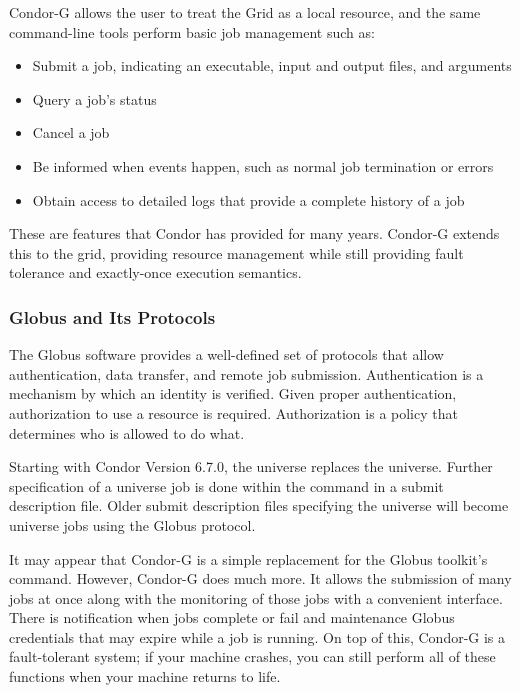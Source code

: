Condor-G allows the user to treat the Grid as a local resource,
and the same command-line tools perform basic job management such as:
\begin{itemize}
\item Submit a job, indicating an executable, input and output files,
and arguments
\item Query a job's status
\item Cancel a job
\item Be informed when events happen,
such as normal job termination or errors
\item Obtain access to detailed logs that provide a complete history of a job
\end{itemize}

These are features that Condor has provided for many years.
Condor-G extends this to the grid,
providing resource management 
while still providing fault tolerance and exactly-once execution 
semantics. 


\subsubsection{\label{sec:Globus-Protocols}Globus and Its Protocols}
The Globus software provides a well-defined set of protocols
that allow authentication, data transfer, and remote job submission.
Authentication is a mechanism by which an identity is verified.
Given proper authentication, authorization to use a resource
is required.
Authorization is a policy that determines who is allowed to do what. 

Starting with Condor Version 6.7.0, the  universe
replaces the  universe.
Further specification of a  universe job is done
within the  command in a submit description file.
Older submit description files specifying the  
universe will become  universe jobs using the
Globus  protocol.

It may appear that Condor-G is a simple replacement
for the Globus toolkit's  command.
However, Condor-G does much more.
It allows the submission of many jobs at once
along with the monitoring of those jobs with a convenient interface.
There is notification when jobs complete or fail
and maintenance Globus credentials
that may expire while a job is running.
On top of this, Condor-G is a fault-tolerant system;
if your machine crashes,
you can still perform all of these functions when your machine returns to life.


